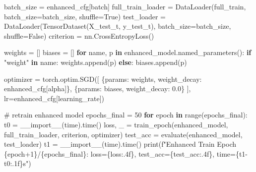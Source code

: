 \documentclass[
  letterpaper,
  DIV=11,
  numbers=noendperiod]{scrartcl}
\newenvironment{Shaded}{\begin{snugshade}}{\end{snugshade}}
\newcommand{\BuiltInTok}[1]{\textcolor[rgb]{0.00,0.23,0.31}{#1}}
\newcommand{\CommentTok}[1]{\textcolor[rgb]{0.37,0.37,0.37}{#1}}
\newcommand{\ControlFlowTok}[1]{\textcolor[rgb]{0.00,0.23,0.31}{\textbf{#1}}}
\newcommand{\DecValTok}[1]{\textcolor[rgb]{0.68,0.00,0.00}{#1}}
\newcommand{\FloatTok}[1]{\textcolor[rgb]{0.68,0.00,0.00}{#1}}
\newcommand{\KeywordTok}[1]{\textcolor[rgb]{0.00,0.23,0.31}{\textbf{#1}}}
\newcommand{\NormalTok}[1]{\textcolor[rgb]{0.00,0.23,0.31}{#1}}
\newcommand{\OperatorTok}[1]{\textcolor[rgb]{0.37,0.37,0.37}{#1}}
\newcommand{\SpecialCharTok}[1]{\textcolor[rgb]{0.37,0.37,0.37}{#1}}
\newcommand{\SpecialStringTok}[1]{\textcolor[rgb]{0.13,0.47,0.30}{#1}}
\newcommand{\StringTok}[1]{\textcolor[rgb]{0.13,0.47,0.30}{#1}}
\newcommand{\VariableTok}[1]{\textcolor[rgb]{0.07,0.07,0.07}{#1}}
\begin{document}
\begin{Shaded}
\begin{Highlighting}[]
\NormalTok{batch\_size }\OperatorTok{=}\NormalTok{ enhanced\_cfg[}\StringTok{\textquotesingle{}batch\textquotesingle{}}\NormalTok{]}
\NormalTok{full\_train\_loader }\OperatorTok{=}\NormalTok{ DataLoader(full\_train, batch\_size}\OperatorTok{=}\NormalTok{batch\_size, shuffle}\OperatorTok{=}\VariableTok{True}\NormalTok{)}
\NormalTok{test\_loader }\OperatorTok{=}\NormalTok{ DataLoader(TensorDataset(X\_test\_t, y\_test\_t), batch\_size}\OperatorTok{=}\NormalTok{batch\_size, shuffle}\OperatorTok{=}\VariableTok{False}\NormalTok{)}
\NormalTok{criterion }\OperatorTok{=}\NormalTok{ nn.CrossEntropyLoss()}

\NormalTok{weights }\OperatorTok{=}\NormalTok{ []}
\NormalTok{biases }\OperatorTok{=}\NormalTok{ []}
\ControlFlowTok{for}\NormalTok{ name, p }\KeywordTok{in}\NormalTok{ enhanced\_model.named\_parameters():}
    \ControlFlowTok{if} \StringTok{"weight"} \KeywordTok{in}\NormalTok{ name:}
\NormalTok{        weights.append(p)}
     \ControlFlowTok{else}\NormalTok{:}
\NormalTok{         biases.append(p)}

\NormalTok{optimizer }\OperatorTok{=}\NormalTok{ torch.optim.SGD([}
\NormalTok{    \{}\StringTok{\textquotesingle{}params\textquotesingle{}}\NormalTok{: weights, }\StringTok{\textquotesingle{}weight\_decay\textquotesingle{}}\NormalTok{: enhanced\_cfg[}\StringTok{\textquotesingle{}alpha\textquotesingle{}}\NormalTok{]\},}
\NormalTok{    \{}\StringTok{\textquotesingle{}params\textquotesingle{}}\NormalTok{: biases, }\StringTok{\textquotesingle{}weight\_decay\textquotesingle{}}\NormalTok{: }\FloatTok{0.0}\NormalTok{\}}
\NormalTok{], lr}\OperatorTok{=}\NormalTok{enhanced\_cfg[}\StringTok{\textquotesingle{}learning\_rate\textquotesingle{}}\NormalTok{])}

\CommentTok{\# retrain enhanced model}
\NormalTok{epochs\_final }\OperatorTok{=} \DecValTok{50}
\ControlFlowTok{for}\NormalTok{ epoch }\KeywordTok{in} \BuiltInTok{range}\NormalTok{(epochs\_final):}
\NormalTok{    t0 }\OperatorTok{=} \BuiltInTok{\_\_import\_\_}\NormalTok{(}\StringTok{\textquotesingle{}time\textquotesingle{}}\NormalTok{).time() }
\NormalTok{    loss, \_ }\OperatorTok{=}\NormalTok{ train\_epoch(enhanced\_model, full\_train\_loader, criterion, optimizer)}
\NormalTok{    test\_acc }\OperatorTok{=}\NormalTok{ evaluate(enhanced\_model, test\_loader) }
\NormalTok{    t1 }\OperatorTok{=} \BuiltInTok{\_\_import\_\_}\NormalTok{(}\StringTok{\textquotesingle{}time\textquotesingle{}}\NormalTok{).time()}
    \BuiltInTok{print}\NormalTok{(}\SpecialStringTok{f"Enhanced Train Epoch }\SpecialCharTok{\{}\NormalTok{epoch}\OperatorTok{+}\DecValTok{1}\SpecialCharTok{\}}\SpecialStringTok{/}\SpecialCharTok{\{}\NormalTok{epochs\_final}\SpecialCharTok{\}}\SpecialStringTok{: loss=}\SpecialCharTok{\{}\NormalTok{loss}\SpecialCharTok{:.4f\}}\SpecialStringTok{, test\_acc=}\SpecialCharTok{\{}\NormalTok{test\_acc}\SpecialCharTok{:.4f\}}\SpecialStringTok{, time=}\SpecialCharTok{\{}\NormalTok{t1}\OperatorTok{{-}}\NormalTok{t0}\SpecialCharTok{:.1f\}}\SpecialStringTok{s"}\NormalTok{)}


\end{Highlighting}
\end{Shaded}
\end{document}
